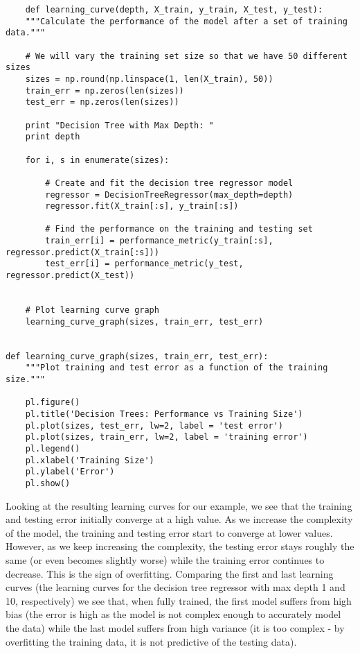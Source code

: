 \documentclass[12 pt]{article}
\numberwithin{equation}{section}
\begin{document}
\begin{verbatim}
	def learning_curve(depth, X_train, y_train, X_test, y_test):
    """Calculate the performance of the model after a set of training data."""

    # We will vary the training set size so that we have 50 different sizes
    sizes = np.round(np.linspace(1, len(X_train), 50))
    train_err = np.zeros(len(sizes))
    test_err = np.zeros(len(sizes))

    print "Decision Tree with Max Depth: "
    print depth

    for i, s in enumerate(sizes):

        # Create and fit the decision tree regressor model
        regressor = DecisionTreeRegressor(max_depth=depth)
        regressor.fit(X_train[:s], y_train[:s])

        # Find the performance on the training and testing set
        train_err[i] = performance_metric(y_train[:s], regressor.predict(X_train[:s]))
        test_err[i] = performance_metric(y_test, regressor.predict(X_test))


    # Plot learning curve graph
    learning_curve_graph(sizes, train_err, test_err)


def learning_curve_graph(sizes, train_err, test_err):
    """Plot training and test error as a function of the training size."""

    pl.figure()
    pl.title('Decision Trees: Performance vs Training Size')
    pl.plot(sizes, test_err, lw=2, label = 'test error')
    pl.plot(sizes, train_err, lw=2, label = 'training error')
    pl.legend()
    pl.xlabel('Training Size')
    pl.ylabel('Error')
    pl.show()
\end{verbatim}
Looking at the resulting learning curves for our example, we see that the training and testing error initially converge at a high value. As we increase the complexity of the model, the training and testing error start to converge at lower values. However, as we keep increasing the complexity, the testing error stays roughly the same (or even becomes slightly worse) while the training error continues to decrease. This is the sign of overfitting. Comparing the first and last learning curves (the learning curves for the decision tree regressor with max depth 1 and 10, respectively) we see that, when fully trained, the first model suffers from high bias (the error is high as the model is not complex enough to accurately model the data) while the last model suffers from high variance (it is too complex - by overfitting the training data, it is not predictive of the testing data). 
\end{document}
